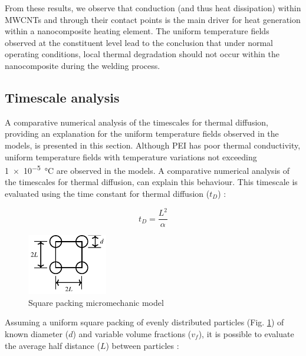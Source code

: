 \documentclass[11pt,review,times]{article}
\begin{document}
From these results, we observe that conduction (and thus heat dissipation) within MWCNTs and through their contact points is the main driver for heat generation within a nanocomposite heating element. 
The uniform temperature fields observed at the constituent level lead to the conclusion that under normal operating conditions, local thermal degradation should not occur within the nanocomposite during the welding process. 

\FloatBarrier
\subsection{Timescale analysis}
\label{sec:timeconstant}

A comparative numerical analysis of the timescales for thermal diffusion, providing an explanation for the uniform temperature fields observed in the models, is presented in this section. 
Although PEI has poor thermal conductivity, uniform temperature fields with temperature variations not exceeding \SI{1e-5}{\celsius} are observed in the models. 
A comparative numerical analysis of the timescales for thermal diffusion, can explain this behaviour. 
This timescale is evaluated using the time constant for thermal diffusion ($t_D$) : 

\begin{equation}
	t_D = \frac{L^2}{\alpha}
	\label{equa:time_constant}
\end{equation}

\begin{figure}[htb]
	\center
	\captionsetup{width=35mm}
	\includegraphics[width=35mm]{arrangement_carre}
	\caption{Square packing micromechanic model}
	\label{fig:square_packing}
\end{figure}

Assuming a uniform square packing of evenly distributed particles (Fig. \ref{fig:square_packing}) of known diameter ($d$) and variable volume fractions ($v_f$), it is possible to evaluate the average half distance ($L$) between particles :
\end{document}
